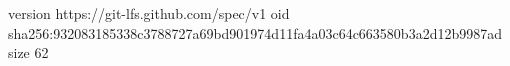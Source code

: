 version https://git-lfs.github.com/spec/v1
oid sha256:932083185338c3788727a69bd901974d11fa4a03c64c663580b3a2d12b9987ad
size 62
